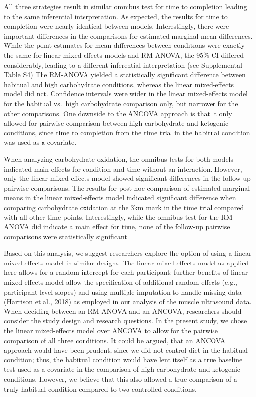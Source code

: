 \documentclass[]{cik}%
\begin{document}
All three strategies result in similar omnibus test for time to
completion leading to the same inferential interpretation. As expected,
the results for time to completion were nearly identical between models.
Interestingly, there were important differences in the comparisons for
estimated marginal mean differences. While the point estimates for mean
differences between conditions were exactly the same for linear
mixed-effects models and RM-ANOVA, the 95\% CI differed considerably,
leading to a different inferential interpretation (see Supplemental
Table S4) The RM-ANOVA yielded a statistically significant difference
between habitual and high carbohydrate conditions, whereas the linear
mixed-effects model did not. Confidence intervals were wider in the
linear mixed-effects model for the habitual vs.~high carbohydrate
comparison only, but narrower for the other comparisons. One downside to
the ANCOVA approach is that it only allowed for pairwise comparison
between high carbohydrate and ketogenic conditions, since time to
completion from the time trial in the habitual condition was used as a
covariate.

When analyzing carbohydrate oxidation, the omnibus tests for both models
indicated main effects for condition and time without an interaction.
However, only the linear mixed-effects model showed significant
differences in the follow-up pairwise comparisons. The results for post
hoc comparison of estimated marginal means in the linear mixed-effects
model indicated significant difference when comparing carbohydrate
oxidation at the 3km mark in the time trial compared with all other time
points. Interestingly, while the omnibus test for the RM-ANOVA did
indicate a main effect for time, none of the follow-up pairwise
comparisons were statistically significant.

Based on this analysis, we suggest researchers explore the option of
using a linear mixed-effects model in similar designs. The linear
mixed-effects model as applied here allows for a random intercept for
each participant; further benefits of linear mixed-effects model allow
the specification of additional random effects (e.g., participant-level
slopes) and using multiple imputation to handle missing data
(\protect\hyperlink{ref-66}{Harrison et al., 2018}) as employed in our
analysis of the muscle ultrasound data. When deciding between an
RM-ANOVA and an ANCOVA, researchers should consider the study design and
research questions. In the present study, we chose the linear
mixed-effects model over ANCOVA to allow for the pairwise comparison of
all three conditions. It could be argued, that an ANCOVA approach would
have been prudent, since we did not control diet in the habitual
condition; thus, the habitual condition would have lent itself as a true
baseline test used as a covariate in the comparison of high carbohydrate
and ketogenic conditions. However, we believe that this also allowed a
true comparison of a truly habitual condition compared to two controlled
conditions.
\end{document}
